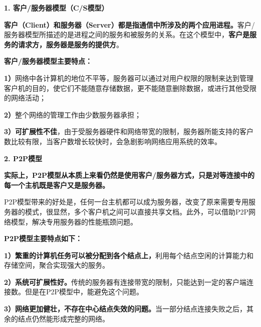 \textbf{{1. 客户/服务器模型（C/S模型）}}

\textbf{客户（Client）和服务器（Server）都是指通信中所涉及的两个应用进程。}客户/服务器模型所描述的是进程之间的服务和被服务的关系。在这个模型中，\textbf{客户是服务的请求方，服务器是服务的提供方}。

\textbf{{客户/服务器模型主要特点：}}

\textbf{1）}网络中各计算机的地位不平等，服务器可以通过对用户权限的限制来达到管理客户机的目的，使它们不能随意存储数据，更不能随意删除数据，或进行其他受限的网络活动；

\textbf{2）}整个网络的管理工作由少数服务器承担；

\textbf{3）可扩展性不佳}，由于受服务器硬件和网络带宽的限制，服务器所能支持的客户数比较有限，当客户数增长较快时，会急剧影响网络应用系统的效率。

\textbf{{2. P2P模型}}

\textbf{实际上，P2P模型从本质上来看仍然是使用客户/服务器方式，只是对等连接中的每一个主机既是客户又是服务器。}

P2P模型带来的好处是，任何一台主机都可以成为服务器，改变了原来需要专用服务器的模式，很显然，多个客户机之间可以直接共享文档。此外，可以借助P2P网络模型，解决专用服务器的性能瓶颈问题。

\textbf{{P2P模型主要特点如下：}}

\textbf{1）繁重的计算机任务可以被分配到各个结点上，}利用每个结点空闲的计算能力和存储空间，聚合实现强大的服务。

\textbf{2）系统可扩展性好。}传统的服务器有连接带宽的限制，只能达到一定的客户端连接数。但是在P2P模型中，能避免这个问题。

\textbf{3）网络更加健壮，不存在中心结点失效的问题。}当一部分结点连接失败之后，其余的结点仍然能形成完整的网络。
